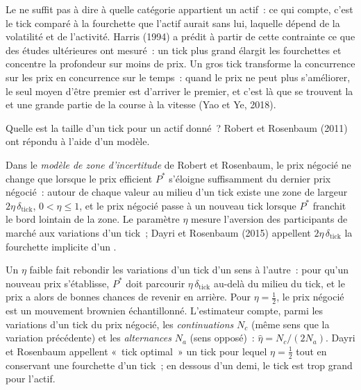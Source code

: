 Le  ne suffit pas à dire à quelle catégorie appartient un actif~: ce qui compte, c'est le tick comparé à la fourchette que l'actif aurait sans lui, laquelle
dépend de la volatilité et de l'activité. Harris (1994) a prédit à partir de cette contrainte ce que des études ultérieures ont mesuré~: un tick plus grand élargit les fourchettes
et concentre la profondeur sur moins de prix. Un gros tick transforme la concurrence sur les prix en concurrence sur le temps~: quand le prix ne peut plus s'améliorer, le seul moyen
d'être premier est d'arriver le premier, et c'est là que se trouvent la  et une grande partie de la course à la vitesse (Yao et Ye, 2018).

Quelle est la taille d'un tick pour un actif donné~? Robert et Rosenbaum (2011) ont répondu à l'aide d'un modèle.

\begin{definition}\label{def:mx:tick-size-queues-and-priority:uz}
Dans le \emph{modèle de zone d'incertitude} de Robert et Rosenbaum, le prix négocié ne change que lorsque le prix efficient
$P^\ast$ s'éloigne suffisamment du dernier prix négocié~: autour de chaque valeur au milieu d'un tick existe une zone de largeur $2\eta\,\delta_{\mathrm{tick}}$, $0<\eta\le1$, et
le prix négocié passe à un nouveau tick lorsque $P^\ast$ franchit le bord lointain de la zone. Le paramètre $\eta$ mesure l'aversion des participants de marché
aux variations d'un tick~; Dayri et Rosenbaum (2015) appellent $2\eta\,\delta_{\mathrm{tick}}$ la fourchette implicite d'un .
\end{definition}

Un $\eta$ faible fait rebondir les variations d'un tick d'un sens à l'autre~: pour qu'un nouveau prix s'établisse, $P^\ast$ doit parcourir $\eta\,\delta_{\mathrm{tick}}$ au-delà du milieu du tick,
et le prix a alors de bonnes chances de revenir en arrière. Pour $\eta=\tfrac12$, le prix négocié est un mouvement brownien échantillonné. L'estimateur compte, parmi les variations d'un tick
du prix négocié, les \emph{continuations} $N_c$ (même sens que la variation précédente) et les \emph{alternances} $N_a$ (sens opposé)~:
$\hat\eta=N_c/(2N_a)$. Dayri et Rosenbaum appellent «~tick optimal~» un tick pour lequel $\eta=\tfrac12$ tout en conservant une fourchette d'un tick~; en dessous d'un demi, le tick est trop
grand pour l'actif.

